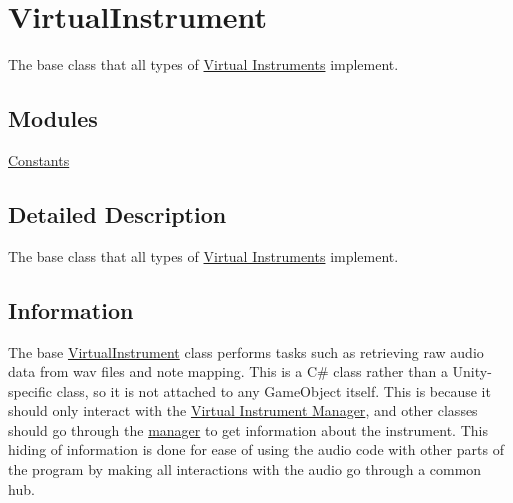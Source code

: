 \hypertarget{group___v_i_base}{}\section{Virtual\+Instrument}
\label{group___v_i_base}


The base class that all types of \hyperlink{group___v_i}{Virtual Instruments} implement.  


\subsection*{Modules}
\begin{DoxyCompactItemize}
\item 
\hyperlink{group___v_i_base_const}{Constants}
\end{DoxyCompactItemize}


\subsection{Detailed Description}
The base class that all types of \hyperlink{group___v_i}{Virtual Instruments} implement. 

\hypertarget{group___v_i_base_DocVIBaseInfo}{}\subsection{Information}\label{group___v_i_base_DocVIBaseInfo}
The base \hyperlink{class_virtual_instrument}{Virtual\+Instrument} class performs tasks such as retrieving raw audio data from wav files and note mapping. This is a C\# class rather than a Unity-\/specific class, so it is not attached to any Game\+Object itself. This is because it should only interact with the \hyperlink{group___v_i_m}{Virtual Instrument Manager}, and other classes should go through the \hyperlink{group___v_i_m}{manager} to get information about the instrument. This hiding of information is done for ease of using the audio code with other parts of the program by making all interactions with the audio go through a common hub.

